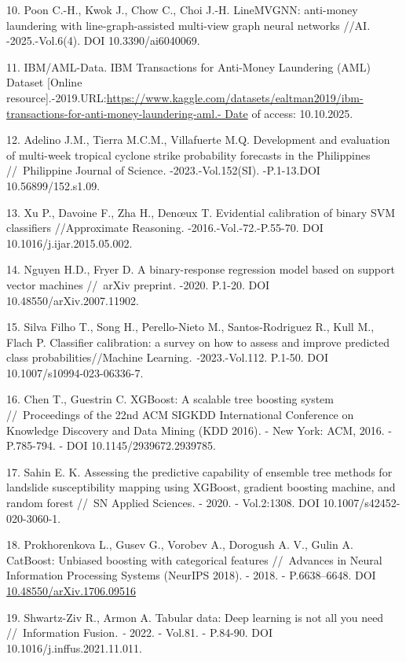 \begin{refs}
10. Poon C.-H., Kwok J., Chow C., Choi J.-H. LineMVGNN: anti-money
laundering with line-graph-assisted multi-view graph neural networks
//AI\emph{.} -2025.-Vol.6(4). DOI 10.3390/ai6040069.

11. IBM/AML-Data. IBM Transactions for Anti-Money Laundering (AML)
Dataset {[}Online
resource{]}.-2019.URL:\href{https://www.kaggle.com/datasets/ealtman2019/ibm-transactions-for-anti-money-laundering-aml.-\%20Date}{https://www.kaggle.com/datasets/ealtman2019/ibm-transactions-for-anti-money-laundering-aml.-
Date} of access: 10.10.2025.

12. Adelino J.M., Tierra M.C.M., Villafuerte M.Q. Development and
evaluation of multi-week tropical cyclone strike probability forecasts
in the Philippines //~Philippine Journal of Science\emph{.}
-2023.-Vol.152(SI). -P.1-13.DOI 10.56899/152.s1.09.

13. Xu P., Davoine F., Zha H., Denœux T. Evidential calibration of binary
SVM classifiers //Approximate Reasoning. -2016.-Vol.-72.-P.55-70. DOI
10.1016/j.ijar.2015.05.002.

14. Nguyen H.D., Fryer D. A binary-response regression model based on
support vector machines //~arXiv preprint\emph{.} -2020. P.1-20. DOI
10.48550/arXiv.2007.11902.

15. Silva Filho T., Song H., Perello-Nieto M., Santos-Rodriguez R., Kull
M., Flach P. Classifier calibration: a survey on how to assess and
improve predicted class probabilities//Machine Learning\emph{.
-}2023.-Vol.112. P.1-50. DOI 10.1007/s10994-023-06336-7.

16. Chen T., Guestrin C. XGBoost: A scalable tree boosting system
//~Proceedings of the 22nd ACM SIGKDD International Conference on
Knowledge Discovery and Data Mining (KDD 2016)\emph{.} - New York: ACM,
2016. - P.785-794. - DOI 10.1145/2939672.2939785.

17. Sahin E. K. Assessing the predictive capability of ensemble tree
methods for landslide susceptibility mapping using XGBoost, gradient
boosting machine, and random forest //~SN Applied Sciences\emph{.} -
2020. - Vol.2:1308. DOI 10.1007/s42452-020-3060-1.

18. Prokhorenkova L., Gusev G., Vorobev A., Dorogush A. V., Gulin A.
CatBoost: Unbiased boosting with categorical features //~Advances in
Neural Information Processing Systems (NeurIPS 2018). - 2018. -
P.6638--6648. DOI
\href{https://doi.org/10.48550/arXiv.1706.09516}{10.48550/arXiv.1706.09516}

19. Shwartz-Ziv R., Armon A. Tabular data: Deep learning is not all you
need //~Information Fusion\emph{. -} 2022. - Vol.81. - P.84-90. DOI
10.1016/j.inffus.2021.11.011.


\end{refs}
